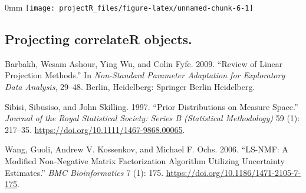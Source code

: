 \documentclass[]{article}
\newcommand{\hlnum}[1]{\textcolor[rgb]{0.816,0.125,0.439}{#1}}%
\newcommand{\hlstr}[1]{\textcolor[rgb]{0.251,0.627,0.251}{#1}}%
\newcommand{\hlcom}[1]{\textcolor[rgb]{0.502,0.502,0.502}{\textit{#1}}}%
\newcommand{\hlstd}[1]{\textcolor[rgb]{0.251,0.251,0.251}{#1}}%
\newenvironment{Shaded}{\begin{myshaded}}{\end{myshaded}}
\newcommand{\DecValTok}[1]{\hlnum{#1}}
\newcommand{\ConstantTok}[1]{\hlnum{#1}}
\newcommand{\SpecialCharTok}[1]{\hlstr{#1}}
\newcommand{\CommentTok}[1]{\hlcom{#1}}
\newcommand{\DocumentationTok}[1]{\hlcom{#1}}
\newcommand{\OtherTok}[1]{{#1}}
\newcommand{\FunctionTok}[1]{\hlstd{#1}}
\newcommand{\AttributeTok}[1]{{#1}}
\newcommand{\NormalTok}[1]{\hlstd{#1}}
\begin{document}
\begin{adjustwidth}{\fltoffset}{0mm}
\texttt{[image: projectR\_files/figure-latex/unnamed-chunk-6-1]} \end{adjustwidth}

\hypertarget{projecting-correlater-objects.}{%
\subsection{Projecting correlateR objects.}\label{projecting-correlater-objects.}}

\begin{Shaded}
\end{Shaded}

\hypertarget{refs}{}
\begin{CSLReferences}{1}{0}
\leavevmode{}%
Barbakh, Wesam Ashour, Ying Wu, and Colin Fyfe. 2009. {``{Review of Linear Projection Methods}.''} In \emph{Non-Standard Parameter Adaptation for Exploratory Data Analysis}, 29--48. Berlin, Heidelberg: Springer Berlin Heidelberg.

\leavevmode{}%
Sibisi, Sibusiso, and John Skilling. 1997. {``Prior Distributions on Measure Space.''} \emph{Journal of the Royal Statistical Society: Series B (Statistical Methodology)} 59 (1): 217--35. \url{https://doi.org/10.1111/1467-9868.00065}.

\leavevmode{}%
Wang, Guoli, Andrew V. Kossenkov, and Michael F. Ochs. 2006. {``LS-NMF: A Modified Non-Negative Matrix Factorization Algorithm Utilizing Uncertainty Estimates.''} \emph{BMC Bioinformatics} 7 (1): 175. \url{https://doi.org/10.1186/1471-2105-7-175}.

\end{CSLReferences}
\end{document}
